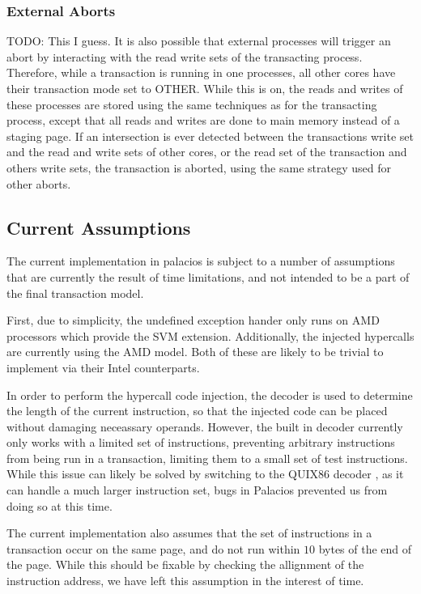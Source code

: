 \documentclass{acm_proc_article-sp}
\begin{document}
\subsubsection{External Aborts}

TODO: This I guess.
It is also possible that external processes will trigger an abort by 
interacting with the read write sets of the transacting process. Therefore, 
while a transaction is running in one processes, all other cores have their
transaction mode set to OTHER. While this is on, the reads and writes of 
these processes are stored using the same techniques as for the transacting
process, except that all reads and writes are done to main memory instead of a 
staging page. If an intersection is ever detected between the transactions
write set and the read and write sets of other cores, or the read set of the
transaction and others write sets, the transaction is aborted, using the same
strategy used for other aborts.  

\subsection{Current Assumptions}

The current implementation in palacios is subject to a number of assumptions
that are currently the result of time limitations, and not intended to be a
part of the final transaction model.

First, due to simplicity, the undefined exception hander only runs on AMD 
processors which provide the SVM extension. Additionally, the injected 
hypercalls are currently using the AMD model. Both of these are likely to be
trivial to implement via their Intel counterparts.  

In order to perform the hypercall code injection, the decoder is used to 
determine the length of the current instruction, so that the injected code
can be placed without damaging neceassary operands. However, the built in
decoder currently only works with a limited set of instructions, preventing
arbitrary instructions from being run in a transaction, limiting them to a 
small set of test instructions. While this issue can likely be solved by 
switching to the QUIX86 decoder \cite{quix86site}, as it can handle a much larger
instruction set, bugs in Palacios prevented us from doing so at this time.

The current implementation also assumes that the set of instructions in a 
transaction occur on the same page, and do not run within $10$ bytes of the
end of the page. While this should be fixable by checking the allignment of
the instruction address, we have left this assumption in the interest of 
time. 
\end{document}
